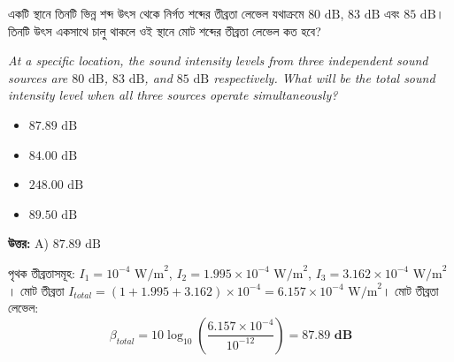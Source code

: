\documentclass[12pt, a4paper]{article}
\begin{document}
\begin{tcolorbox}[questionbox={প্রশ্ন (Question) 8}]
    \noindent
    একটি স্থানে তিনটি ভিন্ন শব্দ উৎস থেকে নির্গত শব্দের তীব্রতা লেভেল যথাক্রমে $80\text{ dB}$, $83\text{ dB}$ এবং $85\text{ dB}$। তিনটি উৎস একসাথে চালু থাকলে ওই স্থানে মোট শব্দের তীব্রতা লেভেল কত হবে?
    
    \vspace{0.8em}
    \begin{english}
    \noindent\textit{\color{darkgray}
    At a specific location, the sound intensity levels from three independent sound sources are $80\text{ dB}$, $83\text{ dB}$, and $85\text{ dB}$ respectively. What will be the total sound intensity level when all three sources operate simultaneously?
    }
    \end{english}
\end{tcolorbox}

\begin{itemize}[label={}, leftmargin=1cm, itemsep=0.5em]
    \item[\textbf{A)}] $87.89\text{ dB}$
    \item[\textbf{B)}] $84.00\text{ dB}$
    \item[\textbf{C)}] $248.00\text{ dB}$
    \item[\textbf{D)}] $89.50\text{ dB}$
\end{itemize}

\vspace{0.5em}
\begin{tcolorbox}[answerbox]
    \textbf{\color{success} উত্তর:} A) $87.89\text{ dB}$
\end{tcolorbox}
\vspace{1em}

\begin{tcolorbox}[solutionbox={সমাধান (Solution)}]
    \noindent
    পৃথক তীব্রতাসমূহ: $I_1 = 10^{-4}\text{ W/m}^2$, $I_2 = 1.995 \times 10^{-4}\text{ W/m}^2$, $I_3 = 3.162 \times 10^{-4}\text{ W/m}^2$। মোট তীব্রতা $I_{total} = (1 + 1.995 + 3.162) \times 10^{-4} = 6.157 \times 10^{-4}\text{ W/m}^2$। মোট তীব্রতা লেভেল:
    \[ \beta_{total} = 10 \log_{10} \left(\frac{6.157 \times 10^{-4}}{10^{-12}}\right) = \mathbf{87.89\text{ dB}} \]
\end{tcolorbox}

\vspace{2em}
\end{document}

